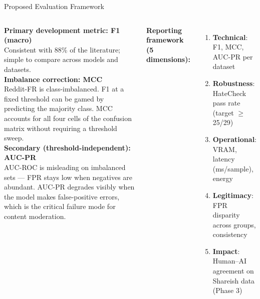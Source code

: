 \documentclass[aspectratio=169, 12pt]{beamer}
\begin{document}
\begin{frame}[shrink=25]{Proposed Evaluation Framework}
  \begin{columns}[T]
      \small\textbf{Primary development metric: F1 (macro)}\\[3pt]
      Consistent with 88\% of the literature; simple to compare across models and datasets.\\[5pt]

      \textbf{Imbalance correction: MCC}\\[3pt]
      Reddit-FR is class-imbalanced. F1 at a fixed threshold can be gamed by predicting the majority class. MCC accounts for all four cells of the confusion matrix without requiring a threshold sweep.\\[5pt]

      \textbf{Secondary (threshold-independent): AUC-PR}\\[3pt]
      AUC-ROC is misleading on imbalanced sets — FPR stays low when negatives are abundant. AUC-PR degrades visibly when the model makes false-positive errors, which is the critical failure mode for content moderation.

      \small\textbf{Reporting framework (5 dimensions):}
      \begin{enumerate}
        \item \textbf{Technical}: F1, MCC, AUC-PR per dataset
        \item \textbf{Robustness}: HateCheck pass rate (target $\geq$25/29)
        \item \textbf{Operational}: VRAM, latency (ms/sample), energy
        \item \textbf{Legitimacy}: FPR disparity across groups, consistency
        \item \textbf{Impact}: Human–AI agreement on Shareish data (Phase 3)
      \end{enumerate}
  \end{columns}
\end{frame}
\end{document}
